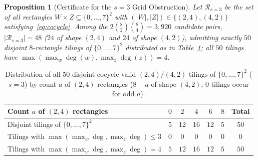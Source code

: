 \documentclass[11pt,reqno]{amsart}
\newtheorem{proposition}[theorem]{Proposition}
\theoremstyle{definition}
\theoremstyle{remark}
\numberwithin{equation}{section}
\begin{document}
\begin{proposition}[Certificate for the $s = 3$ Grid Obstruction]
  \label{prop:enum-s3}
  Let $\mathcal{R}_{s=3}$ be the set of all rectangles $W \times Z \subseteq \{0, \dots, 7\}^2$ with $(|W|, |Z|) \in \{(2, 4), (4, 2)\}$ satisfying~\eqref{eq:cocycle}. Among the $2\binom{8}{2}\binom{8}{4} = 3{,}920$ candidate pairs, $|\mathcal{R}_{s=3}| = 48$ ($24$ of shape $(2, 4)$ and $24$ of shape $(4, 2)$), admitting exactly $50$ disjoint $8$-rectangle tilings of $\{0, \dots, 7\}^2$ distributed as in Table~\ref{tab:s3-tilings}; all $50$ tilings have $\max(\max_w \deg(w), \max_z \deg(z)) = 4$.
\end{proposition}

\begin{table}[ht]
  \centering
  \caption{Distribution of all $50$ disjoint cocycle-valid $(2, 4)/(4, 2)$ tilings of $\{0, \dots, 7\}^2$ ($s = 3$) by count $a$ of $(2, 4)$ rectangles ($8 - a$ of shape $(4, 2)$; $0$ tilings occur for odd $a$).}
  \label{tab:s3-tilings}
  \footnotesize
  \begin{tabular}{@{}lcccccc@{}}
    \toprule
    Count $a$ of $(2, 4)$ rectangles & $0$ & $2$ & $4$ & $6$ & $8$ & Total \\
    \midrule
    Disjoint tilings of $\{0, \dots, 7\}^2$ & $5$ & $12$ & $16$ & $12$ & $5$ & $50$ \\
    Tilings with $\max(\max_w \deg, \max_z \deg) \le 3$ & $0$ & $0$ & $0$ & $0$ & $0$ & $0$ \\
    Tilings with $\max(\max_w \deg, \max_z \deg) = 4$ & $5$ & $12$ & $16$ & $12$ & $5$ & $50$ \\
    \bottomrule
  \end{tabular}
\end{table}
\end{document}
